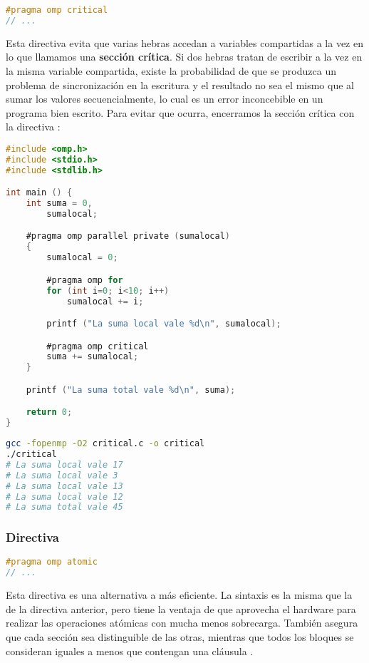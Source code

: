 \begin{lstlisting}[language=C]
#pragma omp critical
// ...
\end{lstlisting}

Esta directiva evita que varias hebras accedan a variables compartidas a la vez en lo que llamamos una \textbf{sección crítica}.
Si dos hebras tratan de escribir a la vez en la misma variable compartida, existe la probabilidad de que se produzca un problema de sincronización en la escritura y el resultado no sea el mismo que al sumar los valores secuencialmente, lo cual es un error inconcebible en un programa bien escrito.
Para evitar que ocurra, encerramos la sección crítica con la directiva :

\begin{lstlisting}[language=C]
#include <omp.h>
#include <stdio.h>
#include <stdlib.h>

int main () {
	int suma = 0,
	    sumalocal;

	#pragma omp parallel private (sumalocal)
	{
		sumalocal = 0;

		#pragma omp for
		for (int i=0; i<10; i++)
			sumalocal += i;

		printf ("La suma local vale %d\n", sumalocal);

		#pragma omp critical
		suma += sumalocal;
	}

	printf ("La suma total vale %d\n", suma);

	return 0;
}
\end{lstlisting}

\begin{lstlisting}[language=sh]
gcc -fopenmp -O2 critical.c -o critical
./critical
# La suma local vale 17
# La suma local vale 3
# La suma local vale 13
# La suma local vale 12
# La suma total vale 45
\end{lstlisting}

\subsubsection{Directiva }

\begin{lstlisting}[language=C]
#pragma omp atomic
// ...
\end{lstlisting}

Esta directiva es una alternativa a  más eficiente.
La sintaxis es la misma que la de la directiva anterior, pero tiene la ventaja de que aprovecha el hardware para realizar las operaciones atómicas con mucha menos sobrecarga.
También asegura que cada sección  sea distinguible de las otras, mientras que todos los bloques  se consideran iguales a menos que contengan una cláusula .

